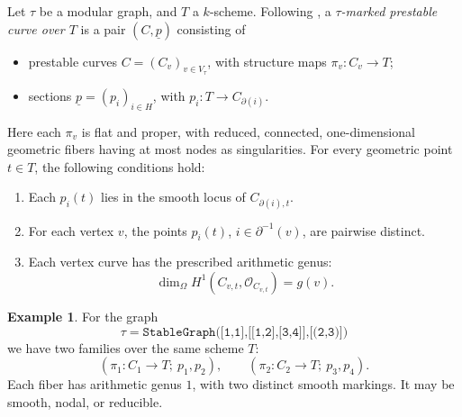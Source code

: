 \documentclass[11pt]{article}
\renewcommand{\O}{\mathcal{O}}
\newcommand{\del}{\partial}
\theoremstyle{plain}
\theoremstyle{remark}
\newcommand{\un}{\underline}
\theoremstyle{plain}
\theoremstyle{definition}
\newtheorem{Ex}[Th]{Example}
\theoremstyle{remark}
\begin{document}
\begin{ptcb}
\begin{Def}\label{notes:def:tau-marked-prestable-curve}
Let \(\tau\) be a modular graph, and \(T\) a \(k\)-scheme. Following
\cite[Definition~2.6]{BM}, a \emph{\(\tau\)-marked prestable curve over \(T\)}
is a pair \((C,\un{p})\) consisting of
\begin{itemize}
  \item prestable curves \(C=(C_v)_{v\in V_\tau}\), with structure maps
  \(\pi_v:C_v\to T\);
  \item sections \(\un{p}=(p_i)_{i\in H}\), with
  \(p_i:T\to C_{\del(i)}\).
\end{itemize}
Here each \(\pi_v\) is flat and proper, with reduced, connected,
one-dimensional geometric fibers having at most nodes as singularities.
For every geometric point \(t\in T\), the following conditions hold:
\begin{enumerate}
  \item Each \(p_i(t)\) lies in the smooth locus of
  \(C_{\del(i),t}\).
  \item For each vertex \(v\), the points
  \(p_i(t)\), \(i\in\del^{-1}(v)\), are pairwise distinct.
  \item Each vertex curve has the prescribed arithmetic genus:
  \[
  \dim_\Omega H^1(C_{v,t},\O_{C_{v,t}})=g(v).
  \]
\end{enumerate}
\end{Def}

\begin{Ex}\label{notes:ex:two-vertex-families}
  For the graph
  \[
    \tau=\texttt{StableGraph([1,1],[[1,2],[3,4]],[(2,3)])}
  \]
  we have two families over the same scheme \(T\):
  \[
    (\pi_1:C_1\to T;\ p_1,p_2),
    \qquad
    (\pi_2:C_2\to T;\ p_3,p_4).
  \]
  Each fiber has arithmetic genus \(1\), with two distinct
  smooth markings. It may be smooth, nodal, or reducible.

  \begin{center}
\end{center}
\end{Ex}
\end{ptcb}
\end{document}
